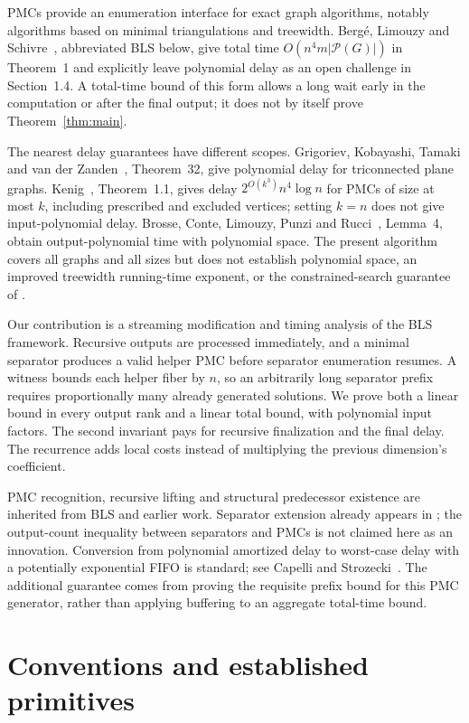 \documentclass[acmsmall,12pt,screen,nonacm]{acmart}
\newcommand{\PMC}{\mathcal P}
\begin{document}
PMCs provide an enumeration interface for exact graph algorithms, notably
algorithms based on minimal triangulations and treewidth. Berg\'e, Limouzy
and Schivre~\cite{BLS26}, abbreviated BLS below, give total time
$O(n^4m|\PMC(G)|)$ in Theorem~1 and explicitly leave polynomial delay as
an open challenge in Section~1.4. A total-time bound of this form allows a
long wait early in the computation or after the final output; it does not
by itself prove Theorem~\ref{thm:main}.

The nearest delay guarantees have different scopes. Grigoriev, Kobayashi,
Tamaki and van der Zanden~\cite{GKTZ25}, Theorem~32, give polynomial delay
for triconnected plane graphs. Kenig~\cite{Kenig26}, Theorem~1.1, gives delay
$2^{O(k^3)}n^4\log n$ for PMCs of size at most $k$, including prescribed and
excluded vertices; setting $k=n$ does not give input-polynomial delay.
Brosse, Conte, Limouzy, Punzi and Rucci~\cite{BCLPR24}, Lemma~4, obtain
output-polynomial time with polynomial space. The present algorithm covers
all graphs and all sizes but does not establish polynomial space, an improved
treewidth running-time exponent, or the constrained-search guarantee of
\cite{Kenig26}.

Our contribution is a streaming modification and timing analysis of the BLS
framework. Recursive outputs are processed immediately, and a minimal
separator produces a valid helper PMC before separator enumeration resumes.
A witness bounds each helper fiber by $n$, so an arbitrarily long separator
prefix requires proportionally many already generated solutions. We prove
both a linear bound in every output rank and a linear total bound, with
polynomial input factors. The second invariant pays for recursive finalization
and the final delay. The recurrence adds local costs instead of multiplying
the previous dimension's coefficient.

PMC recognition, recursive lifting and structural predecessor existence are
inherited from BLS and earlier work. Separator extension already appears in
\cite[Proposition~29]{GKTZ25}; the output-count inequality between separators
and PMCs is not claimed here as an innovation. Conversion from polynomial
amortized delay to worst-case delay with a potentially exponential FIFO is
standard; see Capelli and Strozecki~\cite{CS23,CS26}. The additional guarantee
comes from proving the requisite prefix bound for this PMC generator, rather
than applying buffering to an aggregate total-time bound.

\section{Conventions and established primitives}\label{sec:primitives}
\end{document}
